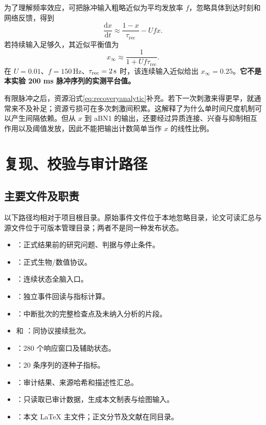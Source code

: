 为了理解频率效应，可把脉冲输入粗略近似为平均发放率 $f$，忽略具体到达时刻和网络反馈，得到
\begin{equation}
\frac{\mathrm{d}x}{\mathrm{d}t}\approx \frac{1-x}{\tau_{\mathrm{rec}}}-Ufx.
\end{equation}
若持续输入足够久，其近似平衡值为
\begin{equation}
x_\infty\approx\frac{1}{1+Uf\tau_{\mathrm{rec}}}.
\end{equation}
在 $U=0.01$、$f=150\,\mathrm{Hz}$、$\tau_{\mathrm{rec}}=2\,\mathrm{s}$ 时，该连续输入近似给出 $x_\infty=0.25$。\textbf{它不是本实验 200 ms 脉冲序列的实测平台值。}

有限脉冲之后，资源沿式\eqref{eq:recoveryanalytic}补充。若下一次刺激来得更早，就通常来不及补足；资源亏损可在多次刺激间积累。这解释了为什么单时间尺度机制可以产生间隔依赖。但从 $x$ 到 aBN1 的输出，还要经过异质连接、兴奋与抑制相互作用以及阈值发放，因此不能把输出计数简单当作 $x$ 的线性比例。

\section{复现、校验与审计路径}
\label{app:repro}
\subsection{主要文件及职责}
以下路径均相对于项目根目录。原始事件文件位于本地忽略目录，论文可读汇总与源文件位于可版本管理目录；两者不是同一种发布状态。
\begin{itemize}
\item {}：正式结果前的研究问题、判据与停止条件。
\item {}：正式生物/数值协议。
\item {}：连续状态全脑入口。
\item {}：独立事件回读与指标计算。
\item {}：中断批次的完整检查点及未纳入分析的片段。
\item {} 和 ：同协议接续批次。
\item {}：280 个响应窗口及辅助状态。
\item {}：20 条序列的逐种子指标。
\item {}：审计结果、来源哈希和描述性汇总。
\item {}：只读取已审计数据，生成本文制表与绘图输入。
\item {}：本文 LaTeX 主文件；正文分节及文献在同目录。
\end{itemize}

